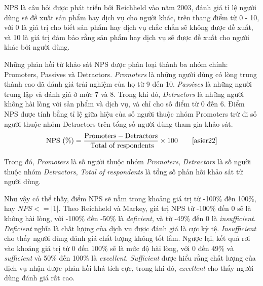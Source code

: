 NPS là câu hỏi được phát triển bởi Reichheld vào năm 2003, đánh giá tỉ lệ người dùng sẽ đề xuất sản phẩm hay dịch vụ cho người khác, trên thang điểm từ 0 - 10, với 0 là giá trị cho biết sản phẩm hay dịch vụ chắc chắn sẽ không được đề xuất, và 10 là giá trị đảm bảo rằng sản phẩm hay dịch vụ sẽ được đề xuất cho người khác bởi người dùng.
\par
Những phản hồi từ khảo sát NPS được phân loại thành ba nhóm chính: Promoters, Passives và Detractors. \emph{Promoters} là những người dùng có lòng trung thành cao đã đánh giá trải nghiệm của họ từ 9 đến 10. \emph{Passives} là những người trung lập và đánh giá ở mức 7 và 8. Trong khi đó, \emph{Detractors} là những người không hài lòng với sản phẩm và dịch vụ, và chỉ cho số điểm từ 0 đến 6. Điểm NPS được tính bằng tỉ lệ giữa hiệu của số người thuộc nhóm Promoters trừ đi số người thuộc nhóm Detractors trên tổng số người dùng tham gia khảo sát.
\[ \text{NPS (\%)} = \frac{\text{Promoters} - \text{Detractors}}{\text{ Total of respondents}} \times 100 \tag*{\cite{asier22}}\]
\par
Trong đó, \emph{Promoters} là số người thuộc nhóm \emph{Promoters}, \emph{Detractors} là số người thuộc nhóm \emph{Detractors}, \emph{Total of respondents} là tổng số phản hồi khảo sát từ người dùng.
\par
Như vậy có thể thấy, điểm NPS sẽ nằm trong khoảng giá trị từ -100\% đến 100\%, hay $NPS <= |1|$. Theo Reichheld và Markey, giá trị NPS từ -100\% đến 0 sẽ là không hài lòng, với -100\% đến -50\% là \emph{deficient}, và từ -49\% đến 0 là \emph{insufficient}. \emph{Deficient} nghĩa là chất lượng của dịch vụ được đánh giá là cực kỳ tệ. \emph{Insufficient} cho thấy người dùng đánh giá chất lượng không tốt lắm. Ngược lại, kết quả rơi vào khoảng giá trị từ 0 đến 100\% sẽ là mức độ hài lòng, với 0 đến 49\% và \emph{sufficient} và 50\% đến 100\% là \emph{excellent}. \emph{Sufficient} được hiểu rằng chất lượng của dịch vụ nhận được phản hồi khá tích cực, trong khi đó, \emph{excellent} cho thấy người dùng đánh giá rất cao.

